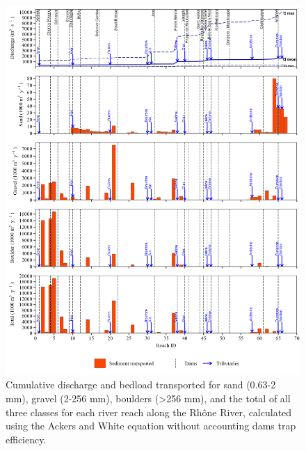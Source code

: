 \documentclass[
]{book}
\begin{document}
\begin{figure}
\includegraphics[width=26.24in]{img/res_cascade/res_E0_eA&W_noDams/plots_transp-silt/transp_res_sum_hy_E0_eA&W_noDams} \caption{Cumulative discharge and bedload transported for sand (0.63-2 mm), gravel (2-256 mm), boulders (>256 mm), and the total of all three classes for each river reach along the Rhône River, calculated using the Ackers and White equation without accounting dams trap efficiency.}\label{fig:TrE0eA}
\end{figure}
\end{document}
